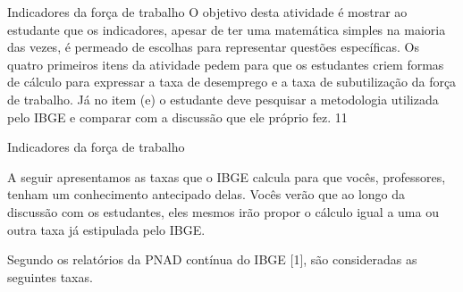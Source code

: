 \clearmargin
\begin{objectives}{Indicadores da força de trabalho}
{
  O objetivo desta atividade é mostrar ao estudante que os indicadores, apesar de ter uma matemática simples na maioria das vezes, é permeado de escolhas para representar questões específicas. Os quatro primeiros itens da atividade pedem para que os estudantes criem formas de cálculo para expressar a taxa de desemprego e a taxa de subutilização da força de trabalho. Já no item (e) o estudante deve pesquisar a metodologia utilizada pelo IBGE e comparar com a discussão que ele próprio fez.
}{1}{1}
\end{objectives}
\begin{sugestions}{Indicadores da força de trabalho}
{
  A seguir apresentamos as taxas que o IBGE calcula para que vocês, professores, tenham um conhecimento antecipado delas. Vocês verão que ao longo da discussão com os estudantes, eles mesmos irão propor o cálculo igual a uma ou outra taxa já estipulada pelo IBGE.

  Segundo os relatórios da PNAD contínua do IBGE [1], são consideradas as seguintes taxas.

  \begin{table}[H]
  \centering
  

\end{table}}
\end{sugestions}
